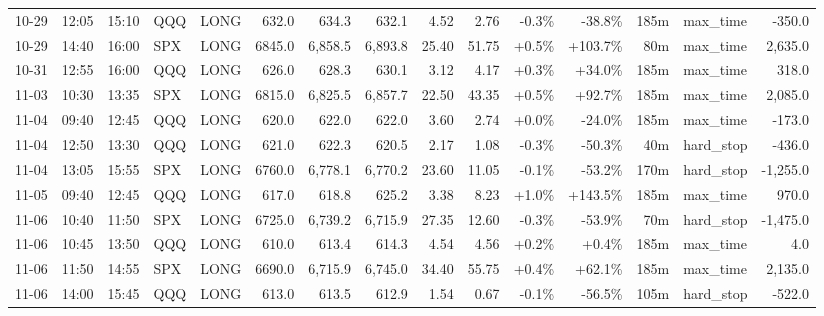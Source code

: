 \documentclass[11pt,a4paper,twoside]{article}
\begin{document}
\begin{landscape}
\begin{center}
\begin{longtable}{>{\color{txtmain}}l l l l l r r r r r r r r >{\color{txtmain}}l r}
10-29 & 12:05 & 15:10 & QQQ & LONG & 632.0 & 634.3 & 632.1 & 4.52 & 2.76 & \textcolor{lossred}{-0.3\%} & \textcolor{lossred}{-38.8\%} & 185m & max\_time & \textcolor{lossred}{-350.0} \\
10-29 & 14:40 & 16:00 & SPX & LONG & 6845.0 & 6,858.5 & 6,893.8 & 25.40 & 51.75 & \textcolor{wingreen}{+0.5\%} & \textcolor{wingreen}{+103.7\%} & 80m & max\_time & \textcolor{wingreen}{2,635.0} \\
10-31 & 12:55 & 16:00 & QQQ & LONG & 626.0 & 628.3 & 630.1 & 3.12 & 4.17 & \textcolor{wingreen}{+0.3\%} & \textcolor{wingreen}{+34.0\%} & 185m & max\_time & \textcolor{wingreen}{318.0} \\
11-03 & 10:30 & 13:35 & SPX & LONG & 6815.0 & 6,825.5 & 6,857.7 & 22.50 & 43.35 & \textcolor{wingreen}{+0.5\%} & \textcolor{wingreen}{+92.7\%} & 185m & max\_time & \textcolor{wingreen}{2,085.0} \\
11-04 & 09:40 & 12:45 & QQQ & LONG & 620.0 & 622.0 & 622.0 & 3.60 & 2.74 & \textcolor{wingreen}{+0.0\%} & \textcolor{lossred}{-24.0\%} & 185m & max\_time & \textcolor{lossred}{-173.0} \\
11-04 & 12:50 & 13:30 & QQQ & LONG & 621.0 & 622.3 & 620.5 & 2.17 & 1.08 & \textcolor{lossred}{-0.3\%} & \textcolor{lossred}{-50.3\%} & 40m & hard\_stop & \textcolor{lossred}{-436.0} \\
11-04 & 13:05 & 15:55 & SPX & LONG & 6760.0 & 6,778.1 & 6,770.2 & 23.60 & 11.05 & \textcolor{lossred}{-0.1\%} & \textcolor{lossred}{-53.2\%} & 170m & hard\_stop & \textcolor{lossred}{-1,255.0} \\
11-05 & 09:40 & 12:45 & QQQ & LONG & 617.0 & 618.8 & 625.2 & 3.38 & 8.23 & \textcolor{wingreen}{+1.0\%} & \textcolor{wingreen}{+143.5\%} & 185m & max\_time & \textcolor{wingreen}{970.0} \\
11-06 & 10:40 & 11:50 & SPX & LONG & 6725.0 & 6,739.2 & 6,715.9 & 27.35 & 12.60 & \textcolor{lossred}{-0.3\%} & \textcolor{lossred}{-53.9\%} & 70m & hard\_stop & \textcolor{lossred}{-1,475.0} \\
11-06 & 10:45 & 13:50 & QQQ & LONG & 610.0 & 613.4 & 614.3 & 4.54 & 4.56 & \textcolor{wingreen}{+0.2\%} & \textcolor{wingreen}{+0.4\%} & 185m & max\_time & \textcolor{wingreen}{4.0} \\
11-06 & 11:50 & 14:55 & SPX & LONG & 6690.0 & 6,715.9 & 6,745.0 & 34.40 & 55.75 & \textcolor{wingreen}{+0.4\%} & \textcolor{wingreen}{+62.1\%} & 185m & max\_time & \textcolor{wingreen}{2,135.0} \\
11-06 & 14:00 & 15:45 & QQQ & LONG & 613.0 & 613.5 & 612.9 & 1.54 & 0.67 & \textcolor{lossred}{-0.1\%} & \textcolor{lossred}{-56.5\%} & 105m & hard\_stop & \textcolor{lossred}{-522.0} \\

\end{longtable}
\end{center}
\end{landscape}
\end{document}
